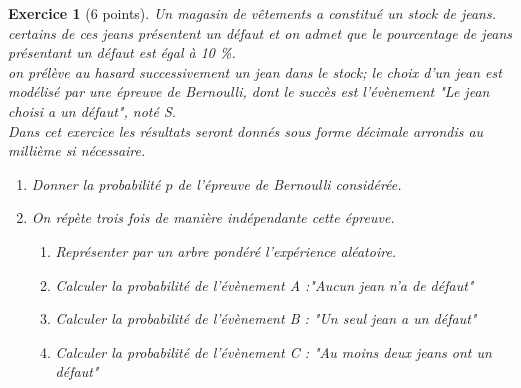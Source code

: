 \documentclass[11pt,a4paper]{article}
\theoremstyle{break}
\newtheorem{exo}{Exercice}
\begin{document}
\begin{exo}[6 points]
	Un magasin de vêtements a constitué un stock de jeans. certains de ces jeans présentent un défaut et on admet que le pourcentage de jeans présentant un défaut est égal à 10 \%.\\
	on prélève au hasard successivement un jean dans le stock; le choix d'un jean est modélisé par une épreuve de Bernoulli, dont le succès est l'évènement "Le jean choisi a un défaut", noté S.\\
	Dans cet exercice les résultats seront donnés sous forme décimale arrondis au millième si nécessaire.
	\begin{enumerate}
		\item Donner la probabilité $p$ de l'épreuve de Bernoulli considérée.
		\item On répète trois fois de manière indépendante cette épreuve.
		\begin{enumerate}
			\item Représenter par un arbre pondéré l'expérience aléatoire.
			\item Calculer la probabilité de l'évènement A :"Aucun jean n'a de défaut"
			\item Calculer la probabilité de l'évènement B : "Un seul jean a un défaut"
			\item Calculer la probabilité de l'évènement C : "Au moins deux jeans ont un défaut"
		\end{enumerate}
	\end{enumerate}
\end{exo}
\end{document}
